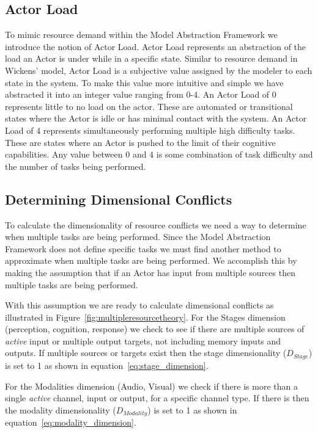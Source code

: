   
\subsection{Actor Load}
To mimic resource demand within the Model Abstraction Framework we introduce the notion of Actor Load.  Actor Load represents an abstraction of the load an Actor is under while in a specific state.  Similar to resource demand in Wickens' model, Actor Load is a subjective value assigned by the modeler to each state in the system.  To make this value more intuitive and simple we have abstracted it into an integer value ranging from 0-4.  An Actor Load of 0 represents little to no load on the actor.  These are automated or transitional states where the Actor is idle or has minimal contact with the system.  An Actor Load of 4 represents simultaneously performing multiple high difficulty tasks.  These are states where an Actor is pushed to the limit of their cognitive capabilities. Any value between 0 and 4 is some combination of task difficulty and the number of tasks being performed.

\subsection{Determining Dimensional Conflicts}
To calculate the dimensionality of resource conflicts we need a way to determine when multiple tasks are being performed.  Since the Model Abstraction Framework does not define specific tasks we must find another method to approximate when multiple tasks are being performed.  We accomplish this by making the assumption that if an Actor has input from multiple sources then multiple tasks are being performed.


With this assumption we are ready to calculate dimensional conflicts as illustrated in Figure~\ref{fig:multipleresourcetheory}.
For the Stages dimension (perception, cognition, response) we check to see if there are multiple sources of {\em active} input or multiple output targets, not including memory inputs and outputs.  If multiple sources or targets exist then the stage dimensionality ($D_{Stage}$) is set to 1 as shown in equation~\ref{eq:stage_dimension}.  

For the Modalities dimension (Audio, Visual) we check if there is more than a single {\em active} channel, input or output, for a specific channel type.  If there is then the modality dimensionality ($D_{Modality}$) is set to 1 as shown in equation~\ref{eq:modality_dimension}.

